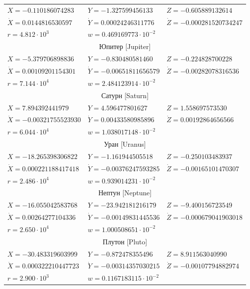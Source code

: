 \begin{table}[p]
\begin{minipage}[t]{132mm}
\begin{tabular}{lll}
$X=	-0.110186074283	$	&	$Y=	-1.327599456133	$	&	$Z=	-0.605889132614	$	\\
$\dot{X}=	0.0144816530597	$	&	$\dot{Y}=	0.00024246311776	$	&	$\dot{Z}=	-0.000281520734247	$	\\
$r=	4.812 \cdot 10^3	$	&	$w = 0.469169773\cdot  10^{-2}	$	&				\\ \hline
\multicolumn{3}{c}{	Юпитер	 [Jupiter]			}	\\ \hline
$X=	-5.379706898836	$	&	$Y=	-0.830480581460	$	&	$Z=	-0.224828700228	$	\\
$\dot{X}=	0.00109201154301	$	&	$\dot{Y}=	-0.00651811656579	$	&	$\dot{Z}=	-0.00282078316536	$	\\
$r=	7.144 \cdot 10^4	$	&	$w = 2.484123914\cdot  10^{-2}	$	&				\\ \hline
\multicolumn{3}{c}{	Сатурн	[Saturn]			}	\\ \hline
$X=	7.894392441979	$	&	$Y=	4.596477801627	$	&	$Z=	1.558697573530	$	\\
$\dot{X}=	-0.00321755523930	$	&	$\dot{Y}=	0.00433580985896	$	&	$\dot{Z}=	0.00192864656566	$	\\
$r=	6.044 \cdot 10^4	$	&	$w = 1.038017148\cdot  10^{-2}	$	&				\\ \hline
\multicolumn{3}{c}{		Уран [Uranus]			}	\\ \hline
$X=	-18.265398306822	$	&	$Y=	-1.161944505518	$	&	$Z=	-0.250103483937	$	\\
$\dot{X}=	0.000221188417418	$	&	$\dot{Y}=	-0.00376247593285	$	&	$\dot{Z}=	-0.00165101470307	$	\\
$r=	2.486 \cdot 10^4	$	&	$w = 0.939014231\cdot  10^{-2}	$	&				\\ \hline
\multicolumn{3}{c}{	Нептун	[Neptune]			}	\\ \hline
$X=	-16.055042583768	$	&	$Y=	-23.942181216179	$	&	$Z=	-9.400156723549	$	\\
$\dot{X}=	0.00264277104336	$	&	$\dot{Y}=	-0.00149831445536	$	&	$\dot{Z}=	-0.000679041903018	$	\\
$r=	2.650 \cdot 10^4	$	&	$w = 1.000508651\cdot  10^{-2}	$	&				\\ \hline
\multicolumn{3}{c}{		Плутон	[Pluto]			}	\\ \hline
$X=	-30.483319603999	$	&	$Y=	-0.872478355496	$	&	$Z=	8.911563040990	$	\\
$\dot{X}=	0.000322210447723	$	&	$\dot{Y}=	-0.00314357030215	$	&	$\dot{Z}=	-0.00107794882974	$	\\
$r=	2.900 \cdot 10^3	$	&	$w = 0.1167183115\cdot  10^{-2}	$	&				\\ \hline

\end{tabular}
\end{minipage}
\end{table}

